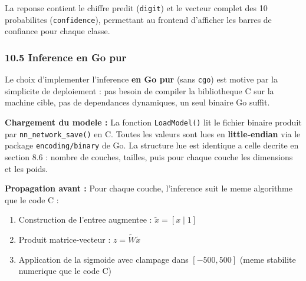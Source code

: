 \documentclass[
  letterpaper,
  DIV=11,
  numbers=noendperiod]{scrartcl}
\providecommand{\tightlist}{%
  \setlength{\itemsep}{0pt}\setlength{\parskip}{0pt}}
\begin{document}
La reponse contient le chiffre predit (\texttt{digit}) et le vecteur complet des 10 probabilites (\texttt{confidence}), permettant au frontend d'afficher les barres de confiance pour chaque classe.

\subsubsection{10.5 Inference en Go pur}\label{inference-go}

Le choix d'implementer l'inference \textbf{en Go pur} (sans \texttt{cgo}) est motive par la simplicite de deploiement : pas besoin de compiler la bibliotheque C sur la machine cible, pas de dependances dynamiques, un seul binaire Go suffit.

\textbf{Chargement du modele :} La fonction \texttt{LoadModel()} lit le fichier binaire produit par \texttt{nn\_network\_save()} en C. Toutes les valeurs sont lues en \textbf{little-endian} via le package \texttt{encoding/binary} de Go. La structure lue est identique a celle decrite en section 8.6 : nombre de couches, tailles, puis pour chaque couche les dimensions et les poids.

\textbf{Propagation avant :} Pour chaque couche, l'inference suit le meme algorithme que le code C :
\begin{enumerate}
\def\labelenumi{\arabic{enumi}.}
\tightlist
\item Construction de l'entree augmentee : \(\tilde{x} = [x \mid 1]\)
\item Produit matrice-vecteur : \(z = \tilde{W} \tilde{x}\)
\item Application de la sigmoide avec clampage dans \([-500, 500]\) (meme stabilite numerique que le code C)
\end{enumerate}
\end{document}
